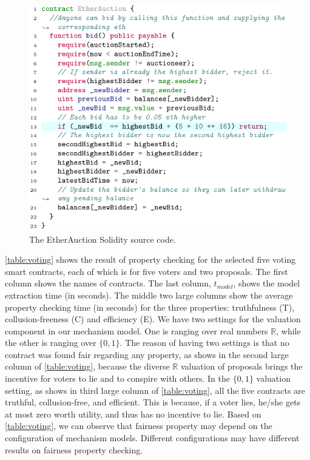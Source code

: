 \begin{figure}[t]
	\includegraphics[width=\columnwidth]{Figures/Chapter2/EtherAuction.pdf}
	\caption{The EtherAuction Solidity source code.}\label{fig:etherauction}
\end{figure}


\cref{table:voting} shows the result of property checking for the selected five voting smart
contracts, each of which is for five voters and two proposals. The first column shows the names of
contracts. The last column, $t_{model}$, shows the model extraction time (in seconds). The middle
two large columns show the average property checking time (in seconds) for the three properties:
truthfulness (T), collusion-freeness (C) and efficiency (E). We have two settings for the valuation
component in our mechanism model. One is ranging over real numbers $\mathbb{R}$, while the other is
ranging over $\{0, 1\}$. The reason of having two settings is that no contract was found fair
regarding any property, as shows in the second large column of \cref{table:voting}, because
the diverse $\mathbb{R}$ valuation of proposals brings the incentive for voters to lie and to
conspire with others. In the $\{0, 1\}$ valuation setting, as shows in third large column of
\cref{table:voting}, all the five contracts are truthful, collusion-free, and efficient. This is
because, if a voter lies, he/she gets at most zero worth utility, and thus has no incentive to lie.
Based on \cref{table:voting}, we can observe that fairness property may depend on the configuration
of mechanism models. Different configurations may have different results on fairness property
checking.

